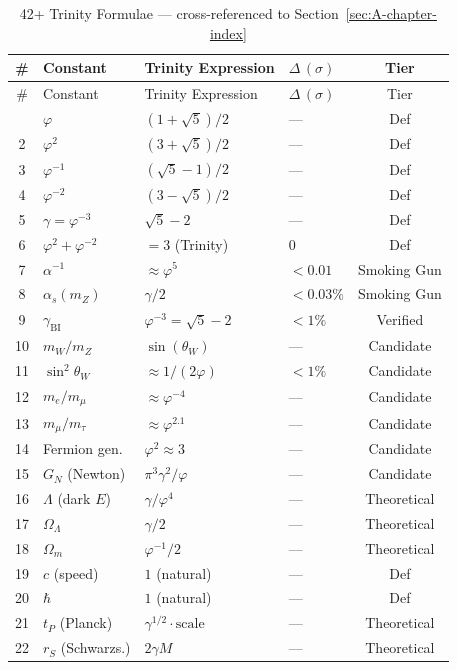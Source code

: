 \begin{longtable}{clllc}
\toprule
\# & Constant & Trinity Expression & $\Delta\,(\sigma)$ & Tier \\
\midrule
\endfirsthead
\toprule
\# & Constant & Trinity Expression & $\Delta\,(\sigma)$ & Tier \\
\midrule
\endhead
\bottomrule
\endfoot
\bottomrule
\caption{42+ Trinity Formulae --- cross-referenced to
  Section~\ref{sec:A-chapter-index}}
\endlastfoot
1 & $\varphi$ & $(1+\sqrt{5})/2$ & --- & Def \\
2 & $\varphi^2$ & $(3+\sqrt{5})/2$ & --- & Def \\
3 & $\varphi^{-1}$ & $(\sqrt{5}-1)/2$ & --- & Def \\
4 & $\varphi^{-2}$ & $(3-\sqrt{5})/2$ & --- & Def \\
5 & $\gamma=\varphi^{-3}$ & $\sqrt{5}-2$ & --- & Def \\
6 & $\varphi^2+\varphi^{-2}$ & $=3$ (Trinity) & $0$ & Def \\
7 & $\alpha^{-1}$ & $\approx\varphi^{5}$ & $<0.01$ & Smoking Gun \\
8 & $\alpha_s(m_Z)$ & $\gamma/2$ & $<0.03\%$ & Smoking Gun \\
9 & $\gamma_{\text{BI}}$ & $\varphi^{-3}=\sqrt{5}-2$ & $<1\%$ & Verified \\
10 & $m_W/m_Z$ & $\sin(\theta_W)$ & --- & Candidate \\
11 & $\sin^2\theta_W$ & $\approx 1/(2\varphi)$ & $<1\%$ & Candidate \\
12 & $m_e/m_\mu$ & $\approx\varphi^{-4}$ & --- & Candidate \\
13 & $m_\mu/m_\tau$ & $\approx\varphi^{2.1}$ & --- & Candidate \\
14 & Fermion gen. & $\varphi^2\approx 3$ & --- & Candidate \\
15 & $G_N$ (Newton) & $\pi^3\gamma^2/\varphi$ & --- & Candidate \\
16 & $\Lambda$ (dark $E$) & $\gamma/\varphi^4$ & --- & Theoretical \\
17 & $\Omega_\Lambda$ & $\gamma/2$ & --- & Theoretical \\
18 & $\Omega_m$ & $\varphi^{-1}/2$ & --- & Theoretical \\
19 & $c$ (speed) & $1$ (natural) & --- & Def \\
20 & $\hbar$ & $1$ (natural) & --- & Def \\
21 & $t_P$ (Planck) & $\gamma^{1/2}\cdot\text{scale}$ & --- & Theoretical \\
22 & $r_S$ (Schwarzs.) & $2\gamma M$ & --- & Theoretical \\

\end{longtable}
